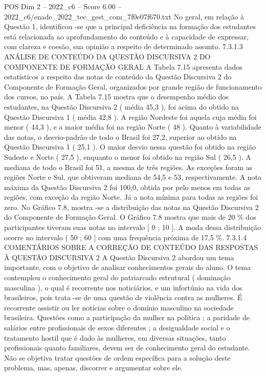 \begin{textsample}{POS Dim 2 – 2022\_c6 – Score 6.00 – 2022\_c6/enade\_2022\_tec\_gest\_com\_7f0e07f670.txt}
No geral, em relação à Questão 1, identificou -se que a principal deficiência na formação dos estudantes está relacionada ao aprofundamento do conteúdo e à capacidade de expressar, com clareza e coesão, sua opinião a respeito de determinado assunto. 7.3.1.3 ANÁLISE DE CONTEÚDO DA QUESTÃO DISCURSIVA 2 DO COMPONENTE DE FORMAÇÃO GERAL A Tabela 7.15 apresenta dados estatísticos a respeito das notas de conteúdo da Questão Discursiva 2 do Componente de Formação Geral, organizados por grande região de funcionamento dos cursos, no país.
A Tabela 7.15 mostra que o desempenho médio dos estudantes, na Questão Discursiva 2 ( média 45,3 ), foi acima do obtido na Questão Discursiva 1 ( média 42,8 ).
A região Nordeste foi aquela cuja média foi menor ( 44,3 ), e a maior média foi na região Norte ( 48 ).
Quanto à variabilidade das notas, o desvio-padrão de todo o Brasil foi 27,2, superior ao obtido na Questão Discursiva 1 ( 25,1 ).
O maior desvio nessa questão foi obtido na região Sudeste e Norte ( 27,5 ), enquanto o menor foi obtido na região Sul ( 26,5 ).
A mediana de todo o Brasil foi 51, a mesma de três regiões.
As exceções foram as regiões Norte e Sul, que obtiveram mediana de 54,5 e 53, respectivamente.
A nota máxima da Questão Discursiva 2 foi 100,0, obtida por pelo menos em todas as regiões, com exceção da região Norte.
Já a nota mínima para todas as regiões foi zero.
No Gráfico 7.8, mostra -se a distribuição das notas na Questão Discursiva 2 do Componente de Formação Geral.
O Gráfico 7.8 mostra que mais de 20 \% dos participantes tiveram suas notas no intervalo [ 0 ; 10 ].
A moda dessa distribuição ocorre no intervalo ( 50 ; 60 ] com uma frequência próxima de 17,5 \%. 7.3.1.4 COMENTÁRIOS SOBRE A CORREÇÃO DE CONTEÚDO DAS RESPOSTAS À QUESTÃO DISCURSIVA 2 A Questão Discursiva 2 abordou um tema importante, com o objetivo de analisar conhecimentos gerais do aluno.
O tema contemplou o conhecimento geral do patriarcado estrutural ( dominação masculina ), o qual é recorrente nos noticiários, e um infortúnio na vida dos brasileiros, pois trata -se de uma questão de violência contra as mulheres.
É recorrente assistir ou ler notícias sobre o domínio masculino na sociedade brasileira.
Questões como a participação da mulher na política ; a paridade de salários entre profissionais de sexos diferentes ; a desigualdade social e o tratamento hostil que é dado às mulheres, em diversas situações, tanto profissionais quanto familiares, devem ser de conhecimento geral do estudante.
Não se objetiva tratar questões de ordem específica para a solução deste problema, mas, apenas, discorrer e argumentar sobre ele.

\end{textsample}
